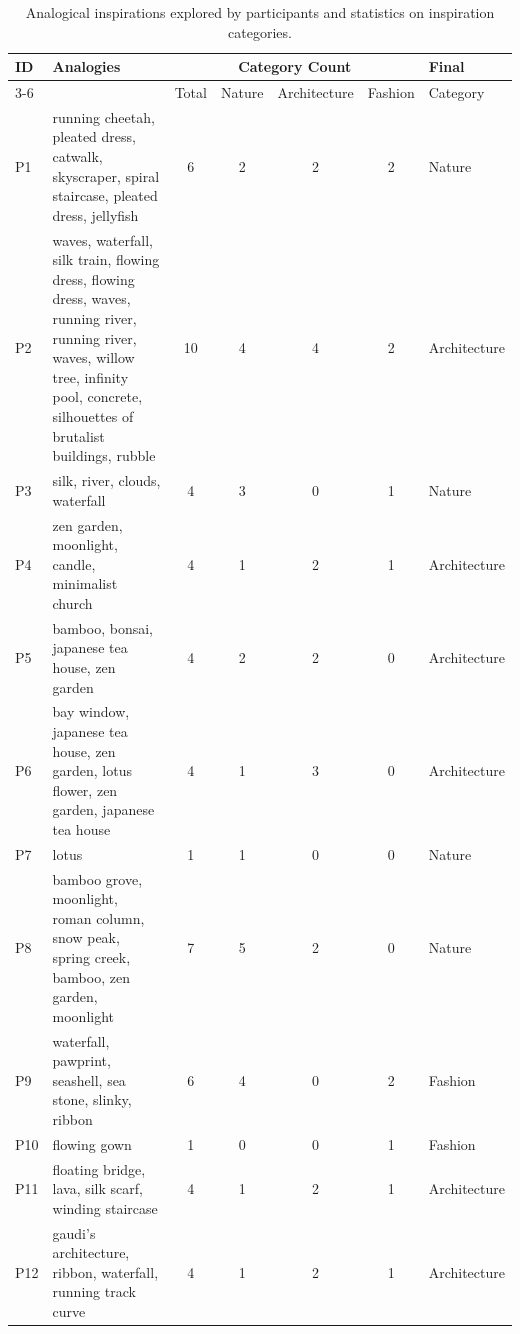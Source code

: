\documentclass[sigconf, screen]{acmart}
\begin{document}
\begin{table}[t]
\small
\begin{tabular}{lp{}ccccl}
\toprule
\multirow{2}{*}{ID} & \multirow{2}{*}{Analogies} & \multicolumn{4}{c}{Category Count} & Final\\ 
\cmidrule(lr){3-6}
& & Total & Nature & Architecture & Fashion & Category\\
\midrule
P1 & running cheetah, pleated dress, catwalk, skyscraper, spiral staircase, pleated dress, jellyfish & 6 & 2 & 2 & 2 & Nature \\
P2 & waves, waterfall, silk train, flowing dress, flowing dress, waves, running river, running river, waves, willow tree, infinity pool, concrete, silhouettes of brutalist buildings, rubble & 10 & 4 & 4 & 2 & Architecture \\
P3 & silk, river, clouds, waterfall & 4 & 3 & 0 & 1 & Nature \\
P4 & zen garden, moonlight, candle, minimalist church & 4 & 1 & 2 & 1 & Architecture \\
P5 & bamboo, bonsai, japanese tea house, zen garden & 4 & 2 & 2 & 0 & Architecture \\
P6 & bay window, japanese tea house, zen garden, lotus flower, zen garden, japanese tea house & 4 & 1 & 3 & 0 & Architecture \\
P7 & lotus & 1 & 1 & 0 & 0 & Nature \\
P8 & bamboo grove, moonlight, roman column, snow peak, spring creek, bamboo, zen garden, moonlight & 7 & 5 & 2 & 0 & Nature \\
P9 & waterfall, pawprint, seashell, sea stone, slinky, ribbon & 6 & 4 & 0 & 2 & Fashion \\
P10 & flowing gown & 1 & 0 & 0 & 1 & Fashion \\
P11 & floating bridge, lava, silk scarf, winding staircase & 4 & 1 & 2 & 1 & Architecture \\
P12 & gaudi's architecture, ribbon, waterfall, running track curve & 4 & 1 & 2 & 1 & Architecture \\
\bottomrule
\end{tabular}
\caption{Analogical inspirations explored by participants and statistics on inspiration categories.}
\label{table:analogy-categories}
\end{table}

\end{document}
